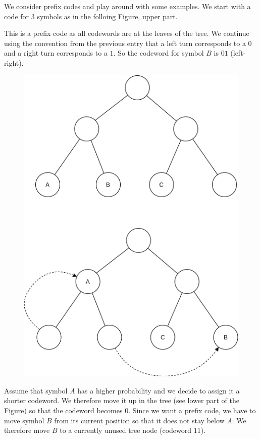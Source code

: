 
We consider prefix codes and play around with some examples. We start with a code for $3$ symbols as in the folloing Figure, upper part.

This is a prefix code as all codewords are at the leaves of the tree. We continue using the convention from the previous entry that a left turn corresponds to a $0$ and a right turn corresponds to a $1$. So the codeword for symbol $B$ is $01$ (left-right).

\begin{figure}[H]
    \centering
    \includegraphics[scale=0.4]{images/2021-04-26-scenario_1.png}
\end{figure}

Assume that symbol $A$ has a higher probability and we decide to assign it a shorter codeword. We therefore move it up in the tree (see lower part of the Figure) so that the codeword becomes $0$. Since we want a prefix code, we have to move symbol $B$ from its current position so that it does not stay below $A$. We therefore move $B$ to a currently unused tree node (codeword $11$).

